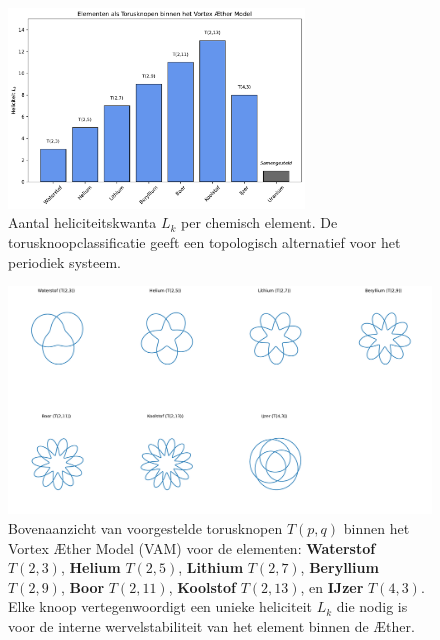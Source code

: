 \begin{figure}[H]
    \centering
    \includegraphics[width=0.7\textwidth]{sections/2_elementenTorusknopen}
    \caption{Aantal heliciteitskwanta $L_k$ per chemisch element. De torusknoopclassificatie geeft een topologisch alternatief voor het periodiek systeem.}
    \label{fig:elementen_torusknoop}
\end{figure}

\begin{figure}[H]
    \centering
    \includegraphics[width=\textwidth]{sections/0_eersteKnopen}
    \caption[Torusknopen voor lichte elementen (bovenaanzicht)]{
        Bovenaanzicht van voorgestelde torusknopen \( T(p, q) \) binnen het Vortex \AE ther Model (VAM) voor de elementen:
        \textbf{Waterstof} \(T(2,3)\),
        \textbf{Helium} \(T(2,5)\),
        \textbf{Lithium} \(T(2,7)\),
        \textbf{Beryllium} \(T(2,9)\),
        \textbf{Boor} \(T(2,11)\),
        \textbf{Koolstof} \(T(2,13)\), en
        \textbf{IJzer} \(T(4,3)\).
        Elke knoop vertegenwoordigt een unieke heliciteit \( L_k \) die nodig is voor de interne wervelstabiliteit van het element binnen de Æther.
    }
    \label{fig:torusknopen_top}
\end{figure}


